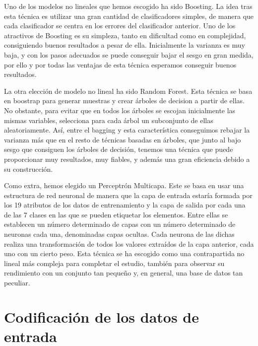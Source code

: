\documentclass{article}
\begin{document}
	Uno de los modelos no lineales que hemos escogido ha sido Boosting. La idea tras esta técnica es utilizar una gran cantidad de clasificadores simples, de manera que cada clasificador se centra en los errores del clasificador anterior. Uno de los atractivos de Boosting es su simpleza, tanto en dificultad como en complejidad, consiguiendo buenos resultados a pesar de ella. Inicialmente la varianza es muy baja, y con los pasos adecuados se puede conseguir bajar el sesgo en gran medida, por ello y por todas las ventajas de esta técnica esperamos conseguir buenos resultados.
	
	La otra elección de modelo no lineal ha sido Random Forest. Esta técnica se basa en boostrap para generar muestras y crear árboles de decision a partir de ellas. No obstante, para evitar que en todos los árboles se escojan inicialmente las mismas variables, selecciona para cada árbol un subconjunto de ellas aleatoriamente. Así, entre el bagging y esta característica conseguimos rebajar la varianza más que en el resto de técnicas basadas en árboles, que junto al bajo sesgo que consiguen los árboles de decisión, tenemos una técnica que puede proporcionar muy resultados, muy fiables, y además una gran eficiencia debido a su construcción.
	
	Como extra, hemos elegido un Perceptrón Multicapa. Este se basa en usar una estructura de red neuronal de manera que la capa de entrada estaría formada por los 19 atributos de los datos de entrenamiento y la capa de salida por cada una de las 7 clases en las que se pueden etiquetar los elementos. Entre ellas se establecen un número determinado de capas con un número determinado de neuronas cada una, denominadas capas ocultas. Cada neurona de las dichas realiza una transformación de todos los valores extraídos de la capa anterior, cada uno con un cierto peso. Esta técnica se ha escogido como una contrapartida no lineal más compleja para completar el estudio, también para observar su rendimiento con un conjunto tan pequeño y, en general, una base de datos tan peculiar.
	
	\section{Codificación de los datos de entrada}
	
\end{document}
